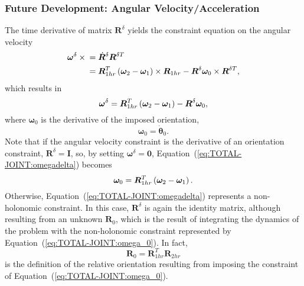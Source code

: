 \documentclass[10pt,dvips,fleqn,subeqn]{report}
\newcommand{\T}[1]{\bm{#1}}
\begin{document}
\subsubsection{Future Development: Angular Velocity/Acceleration}
The time derivative of matrix $\T{R}^{\delta}$ yields
the constraint equation on the angular velocity
\begin{align}
	\T{\omega}^{\delta}\times{}
	&= \dot{\T{R}}^{\delta} \T{R}^{\delta T} \nonumber \\
	&= \T{R}_{1hr}^T \plbr{
		\T{\omega}_2 - \T{\omega}_1
	} \times \T{R}_{1hr}
	- \T{R}^{\delta} \T{\omega}_0 \times \T{R}^{\delta T},
\end{align}
which results in
\begin{equation}
	\T{\omega}^{\delta} = \T{R}_{1hr}^T \plbr{
		\T{\omega}_2 - \T{\omega}_1
	} - \T{R}^{\delta} \T{\omega}_0 ,
	\label{eq:TOTAL-JOINT:omegadelta}
\end{equation}
where $\T{\omega}_0$ is the derivative of the imposed orientation,
\begin{equation}
	\T{\omega}_0 = \dot{\T{\theta}}_0 .
\end{equation}
Note that if the angular velocity constraint 
is the derivative of an orientation constraint, $\T{R}^{\delta}=\T{I}$,
so, by setting $\T{\omega}^{\delta}=\T{0}$,
Equation~(\ref{eq:TOTAL-JOINT:omegadelta}) becomes
\begin{equation}
	\T{\omega}_0 = \T{R}_{1hr}^T \plbr{
		\T{\omega}_2 - \T{\omega}_1
	} .
	\label{eq:TOTAL-JOINT:omega_0}
\end{equation}
Otherwise, Equation~(\ref{eq:TOTAL-JOINT:omegadelta}) represents
a non-holonomic constraint.
In this case, $\T{R}^{\delta}$ is again the identity matrix, although
resulting from an unknown $\T{R}_0$, which is the result of integrating
the dynamics of the problem with the non-holonomic constraint represented
by Equation~(\ref{eq:TOTAL-JOINT:omega_0}).
In fact,
\begin{equation}
	\T{R}_0 = \T{R}_{1hr}^T \T{R}_{2hr}
\end{equation}
is the definition of the relative orientation resulting from 
imposing the constraint of Equation~(\ref{eq:TOTAL-JOINT:omega_0}).
\end{document}
